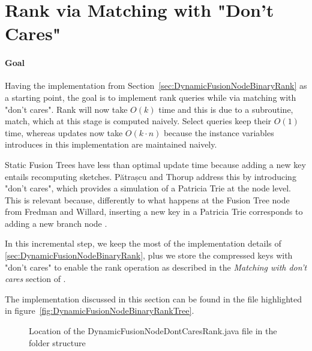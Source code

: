 \newpage
\section{Rank via Matching with "Don't Cares"} \label{sec:rankWithDontCares}

\paragraph*{Goal}
Having the implementation from Section~\ref{sec:DynamicFusionNodeBinaryRank} as a starting point, the goal is to implement rank queries while via matching with "don't cares". Rank will now take $O(k)$ time and this is due to a subroutine, {\ttfamily match}, which at this stage is computed naively. Select queries keep their $O(1)$ time, whereas updates now take $O(k\cdot n)$ because the instance variables introduces in this implementation are maintained naively.

Static Fusion Trees have less than optimal update time because adding a new key entails recomputing sketches. Pătrașcu and Thorup address this by introducing "don't cares", which provides a simulation of a Patricia Trie at the node level. This is relevant because, differently to what happens at the Fusion Tree node from Fredman and Willard, inserting a new key in a Patricia Trie corresponds to adding a new branch node \cite{patrascu2014dynamic}.

In this incremental step, we keep the most of the implementation details of \ref{sec:DynamicFusionNodeBinaryRank}, plus we store the compressed keys with "don't cares" to enable the rank operation as described in the \textit{Matching with don't cares} section of \cite{patrascu2014dynamic}.

The implementation discussed in this section can be found in the file highlighted in figure~\ref{fig:DynamicFusionNodeBinaryRankTree}.
\begin{figure}[H]
\caption{Location of the {\ttfamily DynamicFusionNodeDontCaresRank.java} file in the folder structure}
\label{fig:DynamicFusionNodeDontCaresRankTree}
\end{figure}

